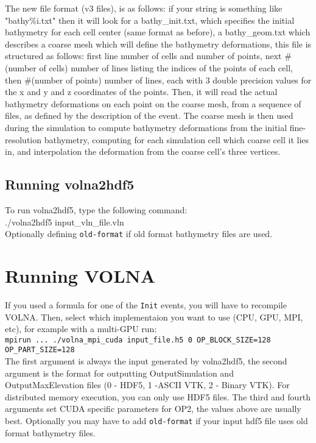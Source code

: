 \documentclass[11pt]{article}
\begin{document}
The new file format (v3 files), is as follows: if your string is something like "bathy\%i.txt" then it will look for a bathy\_init.txt, which specifies the initial bathymetry for each cell center (same format as before), a bathy\_geom.txt which describes a coarse mesh which will define the bathymetry deformations, this file is structured as follows: first line number of cells and number of points, next \#(number of cells) number of lines listing the indices of the points of each cell, then \#(number of points) number of lines, each with 3 double precision values for the x and y and z coordinates of the points. Then, it will read the actual bathymetry deformations on each point on the coarse mesh, from a sequence of files, as defined by the description of the event. The coarse mesh is then used during the simulation to compute bathymetry deformations from the initial fine-resolution bathymetry, computing for each simulation cell which coarse cell it lies in, and interpolation the deformation from the coarse cell's three vertices.

\subsection{Running volna2hdf5}
To run volna2hdf5, type the following command:\\
{\centering ./volna2hdf5 input\_vln\_file.vln}\\
Optionally defining \texttt{old-format} if old format bathymetry files are used.

\section{Running VOLNA} \label{sec/running}
If you used a formula for one of the \texttt{Init} events, you will have to recompile VOLNA. Then, select which implementaion you want to use (CPU, GPU, MPI, etc), for example with a multi-GPU run:\\
{\tt mpirun ... ./volna\_mpi\_cuda input\_file.h5 0 OP\_BLOCK\_SIZE=128 OP\_PART\_SIZE=128}\\
The first argument is always the input generated by volna2hdf5, the second argument is the format for outputting OutputSimulation and OutputMaxElevation files (0 - HDF5, 1 -ASCII VTK, 2 - Binary VTK). For distributed memory execution, you can only use HDF5 files. The third and fourth arguments set CUDA specific parameters for OP2, the values above are usually best. Optionally you may have to add \texttt{old-format} if your input hdf5 file uses old format bathymetry files.
\end{document}
